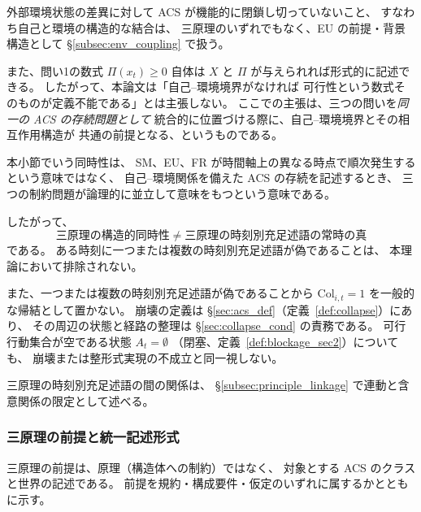 外部環境状態の差異に対して ACS が機能的に閉鎖し切っていないこと、
すなわち自己と環境の構造的な結合は、
三原理のいずれでもなく、EU の前提・背景構造として
\S\ref{subsec:env_coupling} で扱う。

また、問い1の数式 $\Pi(x_t)\ge0$ 自体は
$X$ と $\Pi$ が与えられれば形式的に記述できる。
したがって、本論文は「自己--環境境界がなければ
可行性という数式そのものが定義不能である」とは主張しない。
ここでの主張は、三つの問いを\emph{同一の ACS の存続問題として}
統合的に位置づける際に、自己--環境境界とその相互作用構造が
共通の前提となる、というものである。

\begin{remark}[三原理の構造的同時性]
\label{rem:principles_simultaneity}
本小節でいう同時性は、
SM、EU、FR が時間軸上の異なる時点で順次発生するという意味ではなく、
自己--環境関係を備えた ACS の存続を記述するとき、
三つの制約問題が論理的に並立して意味をもつという意味である。

したがって、
\[
  \text{三原理の構造的同時性}
  \;\neq\;
  \text{三原理の時刻別充足述語の常時の真}
\]
である。
ある時刻に一つまたは複数の時刻別充足述語が偽であることは、
本理論において排除されない。

また、一つまたは複数の時刻別充足述語が偽であることから
$\mathrm{Col}_{i,t}=1$
を一般的な帰結として置かない。
崩壊の定義は \S\ref{sec:acs_def}（定義~\ref{def:collapse}）にあり、
その周辺の状態と経路の整理は \S\ref{sec:collapse_cond} の責務である。
可行行動集合が空である状態
$A_t=\emptyset$
（閉塞、定義~\ref{def:blockage_sec2}）についても、
崩壊または整形式実現の不成立と同一視しない。

三原理の時刻別充足述語の間の関係は、
\S\ref{subsec:principle_linkage} で連動と含意関係の限定として述べる。
\end{remark}

\subsubsection{三原理の前提と統一記述形式}

三原理の前提は、原理（構造体への制約）ではなく、
対象とする ACS のクラスと世界の記述である。
前提を規約・構成要件・仮定のいずれに属するかとともに示す。

